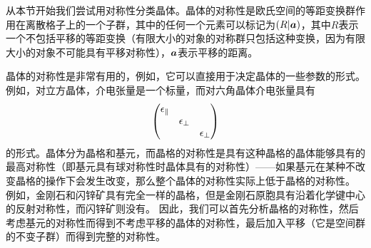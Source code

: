\documentclass[hyperref, UTF8, a4paper]{ctexart}
\begin{document}
从本节开始我们尝试用对称性分类晶体。晶体的对称性是欧氏空间的等距变换群作用在离散格子上的一个子群，其中的任何一个元素可以标记为$(R|\vb*{a})$，其中$R$表示一个不包括平移的等距变换（有限大小的对象的对称群只包括这种变换，因为有限大小的对象不可能具有平移对称性），$\vb*{a}$表示平移的距离。

晶体的对称性是非常有用的，例如，它可以直接用于决定晶体的一些参数的形式。例如，对立方晶体，介电张量是一个标量，而对六角晶体介电张量具有
\[
    \pmqty{\dmat{\epsilon_\parallel, \epsilon_\bot, \epsilon_\bot}}
\]
的形式。晶体分为晶格和基元，而晶格的对称性是具有这种晶格的晶体能够具有的最高对称性（即基元具有球对称性时晶体具有的对称性）——如果基元在某种不改变晶格的操作下会发生改变，那么整个晶体的对称性实际上低于晶格的对称性。
例如，金刚石和闪锌矿具有完全一样的晶格，但是金刚石原胞具有沿着化学键中心的反射对称性，而闪锌矿则没有。 %
因此，我们可以首先分析晶格的对称性，然后考虑基元的对称性而得到不考虑平移的晶体的对称性，最后加入平移（它是空间群的不变子群）而得到完整的对称性。
\end{document}

